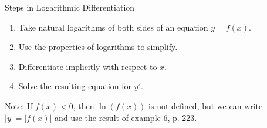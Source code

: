 \begin{frame}
Steps in Logarithmic Differentiation
\begin{enumerate}
\item  Take natural logarithms of both sides of an equation $y = f(x)$.
\item  Use the properties of logarithms to simplify.
\item  Differentiate implicitly with respect to $x$.
\item  Solve the resulting equation for $y'$.
\end{enumerate}
Note: If $f(x) < 0$, then $\ln (f(x))$ is not defined, but we can write $|y| = |f(x)|$ and use the result of example 6, p. 223.
\end{frame}
